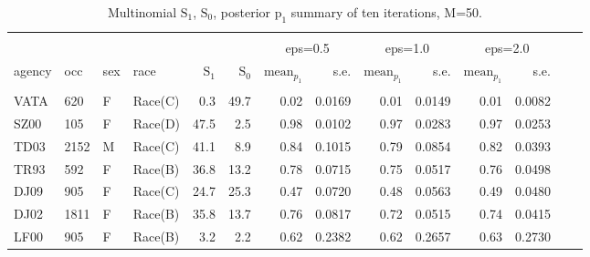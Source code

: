\documentclass[10pt, letterpaper]{article}
\begin{document}
\begin{spacing}{1.0}
\begin{table}[h!]
    \centering
    \caption{Multinomial $\text{S}_1$, $\text{S}_0$, posterior $\text{p}_1$ summary of ten iterations, M=50.}
    \label{table:mn1-M50}
    \begin{tabular}{llllrrrrrrrrrr}
        \hline\\[-10pt]
        & & & & & & \multicolumn{2}{c}{eps=0.5} & \multicolumn{2}{c}{eps=1.0} & \multicolumn{2}{c}{eps=2.0} \\
        agency & occ & sex & race & $\text{S}_1$ & $\text{S}_0$ & $\text{mean}_{p_1}$ & s.e. & $\text{mean}_{p_1}$ & s.e. & $\text{mean}_{p_1}$ & s.e. \\ 
        \hline\\[-6pt]
        VATA & 620 & F & Race(C) & 0.3 & 49.7 & 0.02 & 0.0169 & 0.01 & 0.0149 & 0.01 & 0.0082 \\ 
        SZ00 & 105 & F & Race(D) & 47.5 & 2.5 & 0.98 & 0.0102 & 0.97 & 0.0283 & 0.97 & 0.0253 \\ 
        TD03 & 2152 & M & Race(C) & 41.1 & 8.9 & 0.84 & 0.1015 & 0.79 & 0.0854 & 0.82 & 0.0393 \\ 
        TR93 & 592 & F & Race(B) & 36.8 & 13.2 & 0.78 & 0.0715 & 0.75 & 0.0517 & 0.76 & 0.0498 \\ 
        DJ09 & 905 & F & Race(C) & 24.7 & 25.3 & 0.47 & 0.0720 & 0.48 & 0.0563 & 0.49 & 0.0480 \\ 
        DJ02 & 1811 & F & Race(B) & 35.8 & 13.7 & 0.76 & 0.0817 & 0.72 & 0.0515 & 0.74 & 0.0415 \\ 
        LF00 & 905 & F & Race(B) & 3.2 & 2.2 & 0.62 & 0.2382 & 0.62 & 0.2657 & 0.63 & 0.2730 \\ 
        \hline
    \end{tabular}
\end{table}

\clearpage


\end{spacing}
\end{document}
